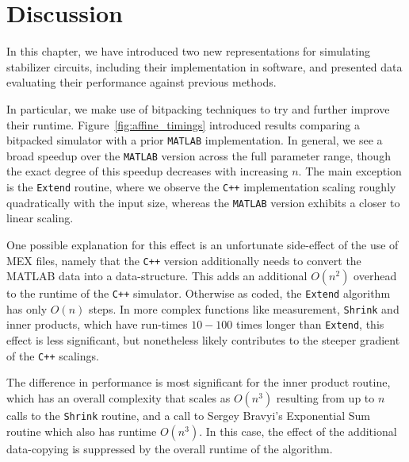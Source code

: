 \section{Discussion}\label{sec:stabilizer_discussion}
In this chapter, we have introduced two new representations for simulating stabilizer circuits, including their implementation in software, and presented data evaluating their performance against previous methods.\par
In particular, we make use of bitpacking techniques to try and further improve their runtime. Figure~\ref{fig:affine_timings} introduced results comparing a bitpacked simulator with a prior \texttt{MATLAB} implementation. In general, we see a broad speedup over the \texttt{MATLAB} version across the full parameter range, though the exact degree of this speedup decreases with increasing $n$. The main exception is the \texttt{Extend} routine, where we observe the \texttt{C++} implementation scaling roughly quadratically with the input size, whereas the \texttt{MATLAB} version exhibits a closer to linear scaling.\par
One possible explanation for this effect is an unfortunate side-effect of the use of MEX files, namely that the \texttt{C++} version additionally needs to convert the MATLAB data into a  data-structure. This adds an additional $O(n^{2})$ overhead to the runtime of the \texttt{C++} simulator. Otherwise as coded, the \texttt{Extend} algorithm has only $O(n)$ steps. In more complex functions like measurement, \texttt{Shrink} and inner products, which have run-times $10-100$ times longer than \texttt{Extend}, this effect is less significant, but nonetheless likely contributes to the steeper gradient of the \texttt{C++} scalings.\par
The difference in performance is most significant for the inner product routine, which has an overall complexity that scales as $O(n^{3})$ resulting from up to $n$ calls to the \texttt{Shrink} routine, and a call to Sergey Bravyi's Exponential Sum routine which also has runtime $O(n^{3})$. In this case, the effect of the additional data-copying is suppressed by the overall runtime of the algorithm. \par

